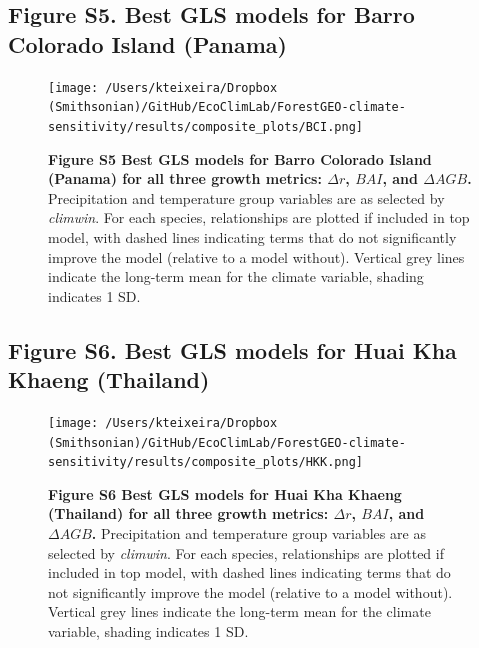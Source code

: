 \documentclass[
]{article}
\begin{document}
\newpage

\hypertarget{figure-s5.-best-gls-models-for-barro-colorado-island-panama}{%
\subsection{Figure S5. Best GLS models for Barro Colorado Island
(Panama)}\label{figure-s5.-best-gls-models-for-barro-colorado-island-panama}}

\begin{figure}
\centering
\texttt{[image: /Users/kteixeira/Dropbox (Smithsonian)/GitHub/EcoClimLab/ForestGEO-climate-sensitivity/results/composite\_plots/BCI.png]}
\caption{\textbf{Figure S5 \textbar{} Best GLS models for Barro Colorado
Island (Panama) for all three growth metrics: \(\Delta r\), \(BAI\), and
\(\Delta AGB\).} Precipitation and temperature group variables are as
selected by \emph{climwin}. For each species, relationships are plotted
if included in top model, with dashed lines indicating terms that do not
significantly improve the model (relative to a model without). Vertical
grey lines indicate the long-term mean for the climate variable, shading
indicates 1 SD.}
\end{figure}

\newpage

\hypertarget{figure-s6.-best-gls-models-for-huai-kha-khaeng-thailand}{%
\subsection{Figure S6. Best GLS models for Huai Kha Khaeng
(Thailand)}\label{figure-s6.-best-gls-models-for-huai-kha-khaeng-thailand}}

\begin{figure}
\centering
\texttt{[image: /Users/kteixeira/Dropbox (Smithsonian)/GitHub/EcoClimLab/ForestGEO-climate-sensitivity/results/composite\_plots/HKK.png]}
\caption{\textbf{Figure S6 \textbar{} Best GLS models for Huai Kha
Khaeng (Thailand) for all three growth metrics: \(\Delta r\), \(BAI\),
and \(\Delta AGB\).} Precipitation and temperature group variables are
as selected by \emph{climwin}. For each species, relationships are
plotted if included in top model, with dashed lines indicating terms
that do not significantly improve the model (relative to a model
without). Vertical grey lines indicate the long-term mean for the
climate variable, shading indicates 1 SD.}
\end{figure}

\newpage
\end{document}
